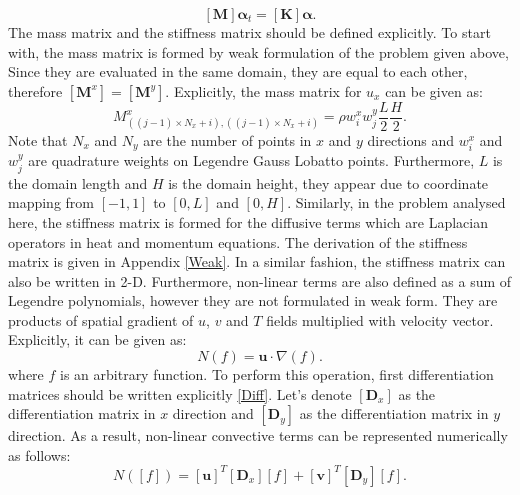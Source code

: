 \documentclass[12pt]{report}
\begin{document}
\begin{equation}
\label{eq:33}
[\mathbf{M}]\mathbf{\alpha}_{t}=[\mathbf{K}]\mathbf{\alpha}.
\end{equation}
The mass matrix and the stiffness matrix should be defined explicitly. To start with, the mass matrix is formed by weak formulation of the problem given above,  Since they are evaluated in the same domain, they are equal to each other, therefore $[\mathbf{M}^x]=[\mathbf{M}^y]$. Explicitly, the mass matrix for $u_x$ can be given as:
\begin{equation}
\label{eq:35}
M^{x}_{((j-1)\times N_x+i),((j-1)\times N_x+i)}=\rho w^{x}_{i}w^{y}_{j}\frac{L}{2}\frac{H}{2}.
\end{equation}
Note that $N_x$ and $N_y$ are the number of points in $x$ and $y$ directions and $w^{x}_i$ and $w^{y}_j$ are quadrature weights on Legendre Gauss Lobatto points.
Furthermore, $L$ is the domain length and $H$ is the domain height, they appear due to coordinate mapping from $[-1,1]$ to $[0,L]$ and $[0,H]$. Similarly, in the problem analysed here, the stiffness matrix is formed for the diffusive terms which are Laplacian operators in heat and momentum equations. The derivation of the stiffness matrix is given in Appendix \ref{Weak}. In a similar fashion, the stiffness matrix can also be written in 2-D.
 Furthermore, non-linear terms are also defined as a sum of Legendre polynomials, however they are not formulated in weak form. They are products of spatial gradient of $u$, $v$ and $T$ fields multiplied with velocity vector. Explicitly, it can be given as:
 \begin{equation}
 \label{eq:36}
 N(f)=\mathbf{u}\cdot \nabla \left( f \right).
 \end{equation} 
 where  $f$ is an arbitrary function. To perform this operation, first differentiation matrices should be written explicitly \ref{Diff}. Let's denote $[\mathbf{D}_x]$ as the differentiation matrix in $x$ direction and $[\mathbf{D}_y]$ as the differentiation matrix in $y$ direction. As a result, non-linear convective terms can be represented numerically as follows:
 \begin{equation}
 \label{eq:37}
 N([f])=[\mathbf{u}]^{T}[\mathbf{D}_x][f]+[\mathbf{v}]^{T}[\mathbf{D}_y][f].
 \end{equation}
\end{document}
